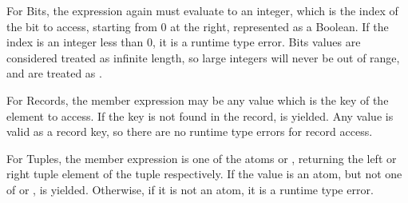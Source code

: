 \begin{prooftree}
\end{prooftree}

\begin{prooftree}
\end{prooftree}

For Bits, the expression again must evaluate to an integer, which
is the index of the bit to access, starting from 0 at the right,
represented as a Boolean. If the index is an integer less than 0,
it is a runtime type error. Bits values are considered treated as
infinite length, so large integers will never be out of range, and
are treated as .

\begin{prooftree}
\end{prooftree}

\begin{prooftree}
\end{prooftree}

For Records, the member expression may be any value which is
the key of the element to access. If the key is not found in the
record,  is yielded. Any value is valid as a record key,
so there are no runtime type errors for record access.

\begin{prooftree}
\end{prooftree}

For Tuples, the member expression is one of the atoms  or
, returning the left or right tuple element of the tuple
respectively. If the value is an atom, but not one of  or
,  is yielded. Otherwise, if it is not an atom,
it is a runtime type error.


